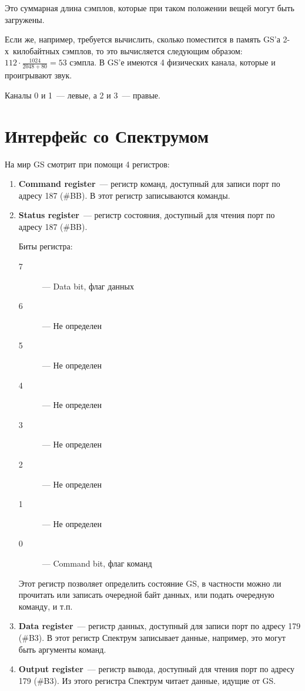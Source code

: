 \documentclass[a4paper,11pt]{article}
\begin{document}
Это суммарная длина сэмплов, которые при таком положении вещей могут быть загружены.

Если же, например, требуется вычислить,  сколько поместится в память GS'а 2-х килобайтных сэмплов, то это вычисляется следующим образом:
\(112\cdotp\frac{1024}{2048+80}=53\) сэмпла.
В GS'е имеются 4 физических канала, которые и проигрывают звук.

Каналы 0 и 1~--- левые, а 2 и 3~--- правые.

\section{Интерфейс со Спектрумом}
На мир GS смотрит при помощи 4 регистров:
\begin{enumerate}
\item \textbf{Command register}~--- регистр команд,  доступный для записи порт по адресу 187 (\#BB). В этот регистр записываются команды.
\item \textbf{Status register}~--- регистр состояния, доступный для чтения порт по адресу 187 (\#BB).

\begin{minipage}{\textwidth}
Биты регистра:
\begin{description}
\item[7] — Data bit, флаг данных
\item[6] — Не определен
\item[5] — Не определен
\item[4] — Не определен
\item[3] — Не определен
\item[2] — Не определен
\item[1] — Не определен
\item[0] — Command bit, флаг команд
\end{description}
\end{minipage}

Этот регистр позволяет определить состояние GS, в частности можно ли прочитать или записать очередной байт данных, или подать очередную команду,  и т.п.

\item \textbf{Data register}~--- регистр данных, доступный для записи порт по адресу 179 (\#B3). В этот регистр Спектрум записывает данные, например, это могут быть аргументы команд.
\item  \textbf{Output register}~--- регистр вывода, доступный для чтения порт по адресу 179 (\#B3). Из этого регистра Спектрум читает данные, идущие от GS.
\end{enumerate}
\end{document}
